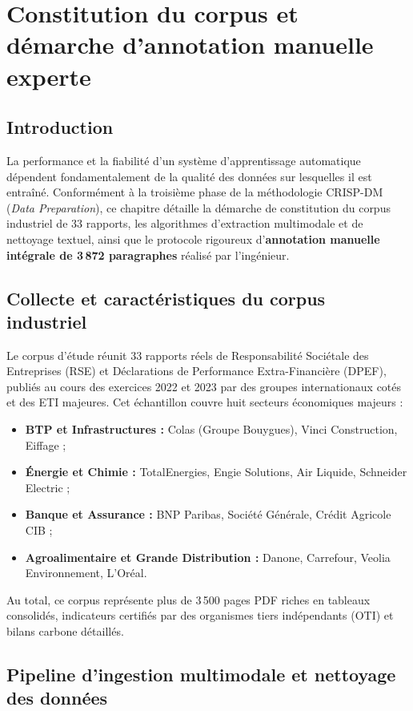 \documentclass[12pt,a4paper]{report}
\begin{document}
\chapter{Constitution du corpus et démarche d'annotation manuelle experte}

\section{Introduction}
La performance et la fiabilité d'un système d'apprentissage automatique dépendent fondamentalement de la qualité des données sur lesquelles il est entraîné. Conformément à la troisième phase de la méthodologie CRISP-DM (\textit{Data Preparation}), ce chapitre détaille la démarche de constitution du corpus industriel de 33 rapports, les algorithmes d'extraction multimodale et de nettoyage textuel, ainsi que le protocole rigoureux d'\textbf{annotation manuelle intégrale de 3\,872 paragraphes} réalisé par l'ingénieur.

\section{Collecte et caractéristiques du corpus industriel}
Le corpus d'étude réunit 33 rapports réels de Responsabilité Sociétale des Entreprises (RSE) et Déclarations de Performance Extra-Financière (DPEF), publiés au cours des exercices 2022 et 2023 par des groupes internationaux cotés et des ETI majeures. Cet échantillon couvre huit secteurs économiques majeurs :
\begin{itemize}
    \item \textbf{BTP et Infrastructures :} Colas (Groupe Bouygues), Vinci Construction, Eiffage ;
    \item \textbf{Énergie et Chimie :} TotalEnergies, Engie Solutions, Air Liquide, Schneider Electric ;
    \item \textbf{Banque et Assurance :} BNP Paribas, Société Générale, Crédit Agricole CIB ;
    \item \textbf{Agroalimentaire et Grande Distribution :} Danone, Carrefour, Veolia Environnement, L'Oréal.
\end{itemize}
Au total, ce corpus représente plus de 3\,500 pages PDF riches en tableaux consolidés, indicateurs certifiés par des organismes tiers indépendants (OTI) et bilans carbone détaillés.

\section{Pipeline d'ingestion multimodale et nettoyage des données}
\end{document}
